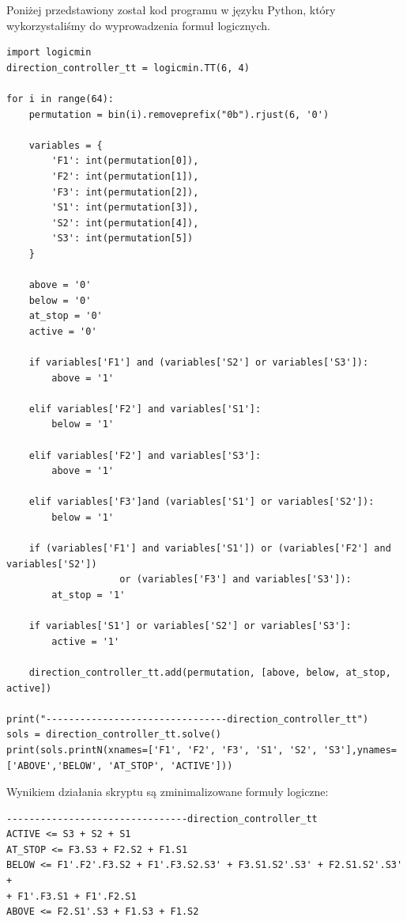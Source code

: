 \documentclass[a4paper]{article}
\begin{document}
Poniżej przedstawiony został kod programu w języku Python, który wykorzystaliśmy do wyprowadzenia
formuł logicznych.
\begin{verbatim}
import logicmin
direction_controller_tt = logicmin.TT(6, 4)

for i in range(64):
    permutation = bin(i).removeprefix("0b").rjust(6, '0')
    
    variables = {
        'F1': int(permutation[0]),
        'F2': int(permutation[1]),
        'F3': int(permutation[2]),
        'S1': int(permutation[3]),
        'S2': int(permutation[4]),
        'S3': int(permutation[5])
    }

    above = '0'
    below = '0'
    at_stop = '0'
    active = '0'

    if variables['F1'] and (variables['S2'] or variables['S3']):
        above = '1'
    
    elif variables['F2'] and variables['S1']:
        below = '1'

    elif variables['F2'] and variables['S3']:
        above = '1'
    
    elif variables['F3']and (variables['S1'] or variables['S2']):
        below = '1'

    if (variables['F1'] and variables['S1']) or (variables['F2'] and variables['S2']) 
                    or (variables['F3'] and variables['S3']):
        at_stop = '1'

    if variables['S1'] or variables['S2'] or variables['S3']:
        active = '1'

    direction_controller_tt.add(permutation, [above, below, at_stop, active])

print("--------------------------------direction_controller_tt")
sols = direction_controller_tt.solve()
print(sols.printN(xnames=['F1', 'F2', 'F3', 'S1', 'S2', 'S3'],ynames=['ABOVE','BELOW', 'AT_STOP', 'ACTIVE']))
\end{verbatim}

\pagebreak
Wynikiem działania skryptu są zminimalizowane formuły logiczne:

\begin{verbatim}
--------------------------------direction_controller_tt
ACTIVE <= S3 + S2 + S1
AT_STOP <= F3.S3 + F2.S2 + F1.S1
BELOW <= F1'.F2'.F3.S2 + F1'.F3.S2.S3' + F3.S1.S2'.S3' + F2.S1.S2'.S3' + 
+ F1'.F3.S1 + F1'.F2.S1
ABOVE <= F2.S1'.S3 + F1.S3 + F1.S2
\end{verbatim}
\end{document}

